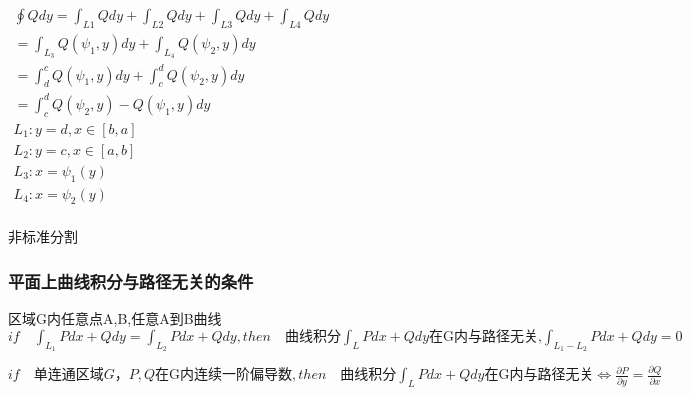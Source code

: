 \documentclass[UTF8]{ctexart}
\newcommand{\mt}[1]{\text{#1}}
\newcommand{\mf}[1]{\left( #1\right)}
\newcommand{\mfc}[1]{\left[ #1 \right]}
\newcommand{\q}{\quad}
\newcommand{\p}{\par}
\newcommand{\ma}[1]{\begin{array}{llll} #1 \end{array}}
\newcommand{\tp}[1]{\begin{tikzpicture}  #1 \end{tikzpicture}}
\newcommand{\tip}[8]{(intersection of #1,#2--#3,#4 and #5,#6--#7,#8)}
\newcommand{\tpo}[2]{\coordinate  %
 (#1) at #2; }
\newcommand{\da}[2]{\frac{\partial #1}{\partial #2}}
\begin{document}
$\ma{\oint Qdy=\int_{L1}Qdy+\int_{L2}Qdy+\int_{L3}Qdy+\int_{L4}Qdy\\
    =\int_{L_3}Q\mf{\psi_1,y}dy+\int_{L_4}Q\mf{\psi_2,y}dy\\
    =\int_d^cQ\mf{\psi_1,y}dy+\int_c^dQ\mf{\psi_2,y}dy \\
    =\int_c^d Q\mf{\psi_2,y}-Q\mf{\psi_1,y}dy\\
L_1:y= d,x \in \mfc{b,a}\\
L_2:y= c,x \in \mfc{a,b}\\
L_3:x= \psi_1\mf{y}\\
L_4:x= \psi_2\mf{y}\\
}$

非标准分割\p


\subsubsection{平面上曲线积分与路径无关的条件}

区域G内任意点A,B,任意A到B曲线$if \q \int_{L_1}Pdx+Qdy=\int_{L_2}Pdx+Qdy ,then \q \mt{曲线积分}\int_{L}Pdx+Qdy\mt{在G内与路径无关,}
\int_{L_1-L_2}Pdx+Qdy=0$


$if \q \mt{单连通区域}G，P,Q\mt{在G内连续一阶偏导数},then \q \mt{曲线积分}\int_{L}Pdx+Qdy\mt{在G内与路径无关} \Leftrightarrow \da{P}{y}=\da{Q}{x}$





 









\end{document}
